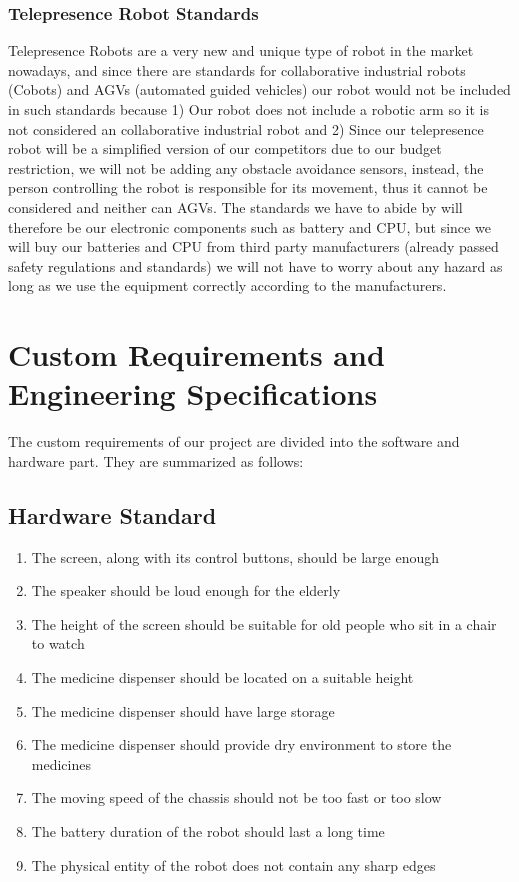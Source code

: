 \documentclass[12pt]{article}
\begin{document}
\subsubsection{Telepresence Robot Standards}
Telepresence Robots are a very new and unique type of robot in the market nowadays, and since there are standards for collaborative industrial robots (Cobots) and AGVs (automated guided vehicles) our robot would not be included in such standards because 1) Our robot does not include a robotic arm so it is not considered an collaborative industrial robot and 2) Since our telepresence robot will be a simplified version of our competitors due to our budget restriction, we will not be adding any obstacle avoidance sensors, instead, the person controlling the robot is responsible for its movement, thus it cannot be considered and neither can AGVs. The standards we have to abide by will therefore be our electronic components such as battery and CPU, but since we will buy our batteries and CPU from third party manufacturers (already passed safety regulations and standards) we will not have to worry about any hazard as long as we use the equipment correctly according to the manufacturers.

\section{Custom Requirements and Engineering Specifications}
The custom requirements of our project are divided into the software and hardware part. They are summarized as follows:
\subsection{Hardware Standard}
\begin{enumerate}
	\item The screen, along with its control buttons, should be large enough 
	\item The speaker should be loud enough for the elderly 
	\item The height of the screen should be suitable for old people who sit in a chair to watch 
	\item The medicine dispenser should be located on a suitable height 
	\item The medicine dispenser should have large storage 
	\item The medicine dispenser should provide dry environment to store the medicines
	\item The moving speed of the chassis should not be too fast or too slow
	\item The battery duration of the robot should last a long time 
	\item The physical entity of the robot does not contain any sharp edges 
\end{enumerate}
\end{document}
